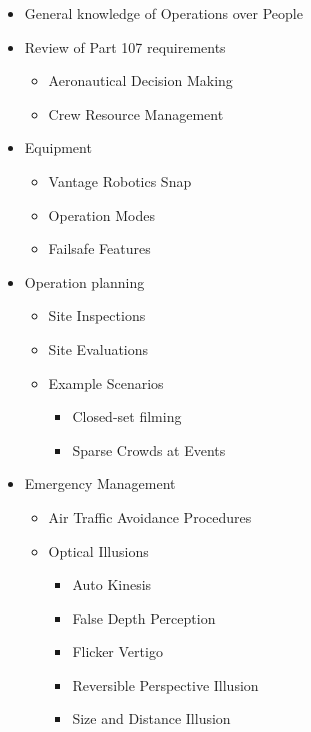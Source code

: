 \documentclass[
]{book}
\providecommand{\tightlist}{%
  \setlength{\itemsep}{0pt}\setlength{\parskip}{0pt}}
\begin{document}
\begin{itemize}
\item
  General knowledge of Operations over People
\item
  Review of Part 107 requirements

  \begin{itemize}
  \tightlist
  \item
    Aeronautical Decision Making
  \item
    Crew Resource Management
  \end{itemize}
\item
  Equipment

  \begin{itemize}
  \tightlist
  \item
    Vantage Robotics Snap
  \item
    Operation Modes
  \item
    Failsafe Features
  \end{itemize}
\item
  Operation planning

  \begin{itemize}
  \item
    Site Inspections
  \item
    Site Evaluations
  \item
    Example Scenarios

    \begin{itemize}
    \tightlist
    \item
      Closed-set filming
    \item
      Sparse Crowds at Events
    \end{itemize}
  \end{itemize}
\item
  Emergency Management

  \begin{itemize}
  \item
    Air Traffic Avoidance Procedures
  \item
    Optical Illusions

    \begin{itemize}
    \tightlist
    \item
      Auto Kinesis
    \item
      False Depth Perception
    \item
      Flicker Vertigo
    \item
      Reversible Perspective Illusion
    \item
      Size and Distance Illusion
    \end{itemize}
  \end{itemize}
\end{itemize}
\end{document}
